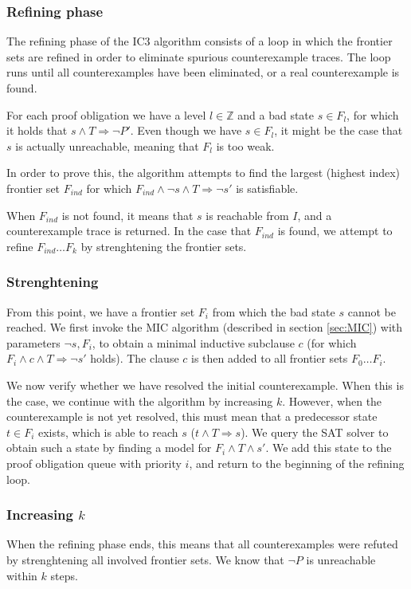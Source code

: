 \documentclass[a4paper]{article}
\begin{document}
\subsubsection{Refining phase}
The refining phase of the IC3 algorithm consists of a loop in which the frontier sets are refined in order to eliminate spurious counterexample traces. The loop runs until all counterexamples have been eliminated, or a real counterexample is found.

For each proof obligation we have a level $l \in \mathbb{Z}$ and a bad state $s \in F_l$, for which it holds that $s \land T \Rightarrow \lnot P'$. Even though we have $s \in F_l$, it might be the case that $s$ is actually unreachable, meaning that $F_l$ is too weak.

In order to prove this, the algorithm attempts to find the largest (highest index) frontier set $F_{ind}$ for which $F_{ind} \land \lnot s \land T \Rightarrow \lnot s'$ is satisfiable.

When $F_{ind}$ is not found, it means that $s$ is reachable from $I$, and a counterexample trace is returned. In the case that $F_{ind}$ is found, we attempt to refine $F_{ind} \ldots F_k$ by strenghtening the frontier sets.

\subsubsection{Strenghtening}
From this point, we have a frontier set $F_i$ from which the bad state $s$ cannot be reached. We first invoke the MIC algorithm (described in section \ref{sec:MIC}) with parameters $\lnot s, F_i$, to obtain a minimal inductive subclause $c$ (for which $F_i \land c \land T \Rightarrow \lnot s'$ holds). The clause $c$ is then added to all frontier sets $F_0 \ldots F_i$.

We now verify whether we have resolved the initial counterexample. When this is the case, we continue with the algorithm by increasing $k$. However, when the counterexample is not yet resolved, this must mean that a predecessor state $t \in F_i$ exists, which is able to reach $s$ ($t \land T \Rightarrow s$). We query the SAT solver to obtain such a state by finding a model for $F_{i} \land T \land s'$. We add this state to the proof obligation queue with priority $i$, and return to the beginning of the refining loop.

\subsubsection{Increasing $k$}
When the refining phase ends, this means that all counterexamples were refuted by strenghtening all involved frontier sets. We know %
that $\lnot P$ is unreachable within $k$ steps.
\end{document}
